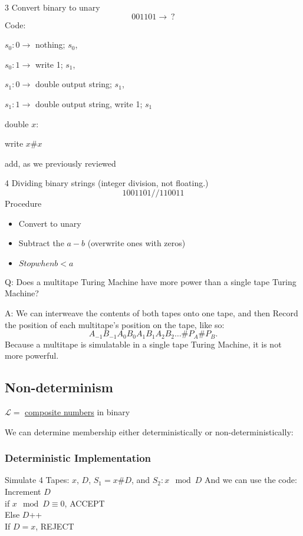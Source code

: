 \begin{example}3
    Convert binary to unary
$$001101 \to \ ?$$
Code:

$s_0: 0 \to$ nothing; $s_0$,

$s_0 : 1 \to$ write 1; $s_1$,

$s_1 : 0 \to$ double output string; $s_1$,

$s_1 : 1 \to$ double output string, write 1; $s_1$

double $x$:

\qquad write $x\#x$

\qquad add, as we previously reviewed
\end{example}

\begin{example}4
    Dividing binary strings (integer division, not floating.)
$$1001101//110011$$
Procedure
\begin{itemize}
    \item Convert to unary
    \item Subtract the $a-b$ (overwrite ones with zeros)
    \item $Stop when b<a$
\end{itemize}
\end{example}

Q: Does a multitape Turing Machine have more power than a single tape
Turing Machine? 

A: We can interweave the contents of both tapes onto one
tape, and then Record the position of each multitape's position on the tape,
like so:
$$A_{-1}B_{-1}A_0B_0A_1B_1A_2B_2\dots\#P_A\#P_B.$$
Because a multitape is simulatable in a single tape Turing Machine, it is not
more powerful.

\subsection{Non-determinism}
$\mathcal L = $ \underline{composite numbers} in binary 

We can determine membership either deterministically or non-deterministically:

\subsubsection*{Deterministic Implementation}
Simulate 4 Tapes: $x$, $D$, $S_1 = x\#D$, and $S_2 : x \mod D$ And we can use the
code:\\

Increment $D$ \\
\quad if $x \mod D \equiv 0$, ACCEPT \\
\quad Else $D$++ \\
If $D=x$, REJECT \\

